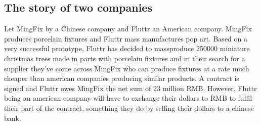 \documentclass[11pt]{article}
\begin{document}





 



\subsection{The story of two companies}

Let MingFix by a Chinese company and Fluttr an American company. MingFix 
produces porcelain fixtures and Fluttr mass manufactures pop art. Based 
on a very successful prototype, Fluttr has decided to massproduce 250000 
miniature christmas trees made in parts with porcelain fixtures and in 
their search for a supplier they've come across MingFix who can produce 
fixtures at a rate much cheaper than american companies producing 
similar products.  A contract is signed and Fluttr owes MingFix the net 
sum of 23 million RMB. However, Fluttr being an american company will 
have to exchange their dollars to RMB to fulfil their part of the 
contract, something they do by selling their dollars to a chinese bank.
\end{document}

